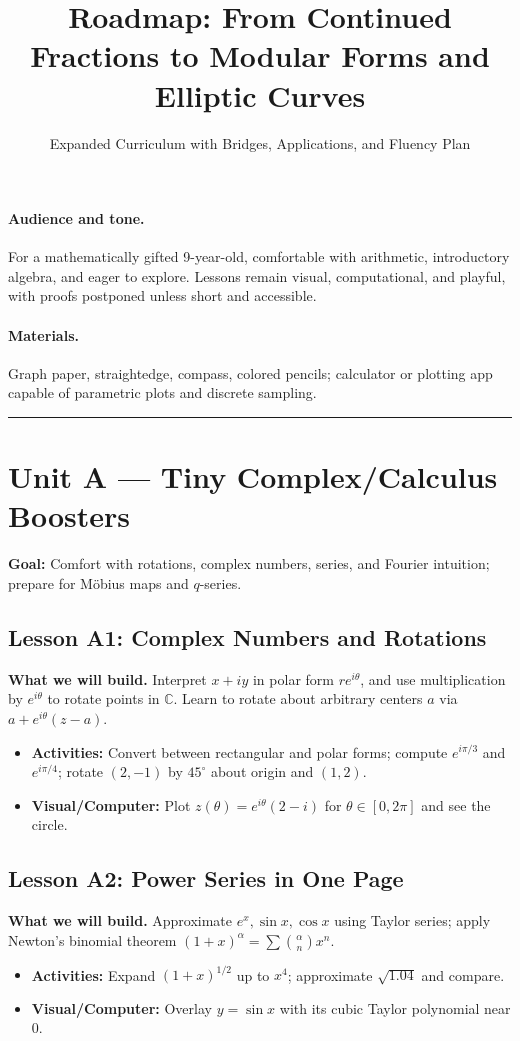 \documentclass[11pt]{article}
\title{Roadmap: From Continued Fractions to Modular Forms and Elliptic Curves}
\author{Expanded Curriculum with Bridges, Applications, and Fluency Plan}
\date{}
\begin{document}
\maketitle

\paragraph{Audience and tone.}
For a mathematically gifted 9-year-old, comfortable with arithmetic, introductory algebra, and eager to explore. Lessons remain visual, computational, and playful, with proofs postponed unless short and accessible. 

\paragraph{Materials.}
Graph paper, straightedge, compass, colored pencils; calculator or plotting app capable of parametric plots and discrete sampling.

\bigskip
\hrule
\bigskip

\section*{Unit A --- Tiny Complex/Calculus Boosters}
\textbf{Goal:} Comfort with rotations, complex numbers, series, and Fourier intuition; prepare for Möbius maps and $q$-series.

\subsection*{Lesson A1: Complex Numbers and Rotations}
\textbf{What we will build.} Interpret $x+iy$ in polar form $re^{i\theta}$, and use multiplication by $e^{i\theta}$ to rotate points in $\mathbb{C}$. Learn to rotate about arbitrary centers $a$ via $a+e^{i\theta}(z-a)$.
\begin{itemize}
\item \textbf{Activities:} Convert between rectangular and polar forms; compute $e^{i\pi/3}$ and $e^{i\pi/4}$; rotate $(2,-1)$ by $45^\circ$ about origin and $(1,2)$.
\item \textbf{Visual/Computer:} Plot $z(\theta)=e^{i\theta}(2-i)$ for $\theta\in[0,2\pi]$ and see the circle.
\end{itemize}

\subsection*{Lesson A2: Power Series in One Page}
\textbf{What we will build.} Approximate $e^x,\sin x,\cos x$ using Taylor series; apply Newton’s binomial theorem $(1+x)^\alpha=\sum\binom{\alpha}{n}x^n$.
\begin{itemize}
\item \textbf{Activities:} Expand $(1+x)^{1/2}$ up to $x^4$; approximate $\sqrt{1.04}$ and compare.
\item \textbf{Visual/Computer:} Overlay $y=\sin x$ with its cubic Taylor polynomial near $0$.
\end{itemize}
\end{document}
